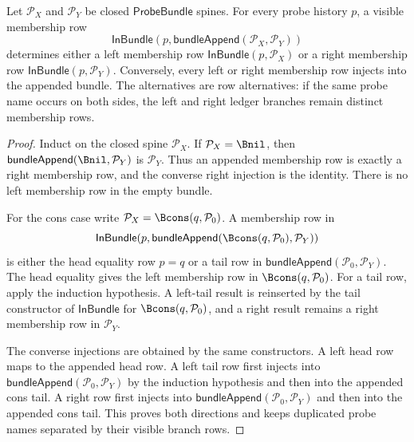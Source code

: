 \begin{lemma}
\label{lem:probebundle-append-membership-row-separation}
Let $\mathcal{P}_X$ and $\mathcal{P}_Y$ be closed $\mathsf{ProbeBundle}$ spines. For every probe history $p$, a visible membership row
$$
\mathsf{InBundle}(p,\mathsf{bundleAppend}(\mathcal{P}_X,\mathcal{P}_Y))
$$
determines either a left membership row $\mathsf{InBundle}(p,\mathcal{P}_X)$ or a right membership row $\mathsf{InBundle}(p,\mathcal{P}_Y)$. Conversely, every left or right membership row injects into the appended bundle. The alternatives are row alternatives: if the same probe name occurs on both sides, the left and right ledger branches remain distinct membership rows.
\end{lemma}
\begin{proof}
Induct on the closed spine $\mathcal{P}_X$. If $\mathcal{P}_X=\Bnil$, then $\mathsf{bundleAppend}(\Bnil,\mathcal{P}_Y)$ is $\mathcal{P}_Y$. Thus an appended membership row is exactly a right membership row, and the converse right injection is the identity. There is no left membership row in the empty bundle.

For the cons case write $\mathcal{P}_X=\Bcons(q,\mathcal{P}_0)$. A membership row in
$$
\mathsf{InBundle}(p,\mathsf{bundleAppend}(\Bcons(q,\mathcal{P}_0),\mathcal{P}_Y))
$$
is either the head equality row $p=q$ or a tail row in $\mathsf{bundleAppend}(\mathcal{P}_0,\mathcal{P}_Y)$. The head equality gives the left membership row in $\Bcons(q,\mathcal{P}_0)$. For a tail row, apply the induction hypothesis. A left-tail result is reinserted by the tail constructor of $\mathsf{InBundle}$ for $\Bcons(q,\mathcal{P}_0)$, and a right result remains a right membership row in $\mathcal{P}_Y$.

The converse injections are obtained by the same constructors. A left head row maps to the appended head row. A left tail row first injects into $\mathsf{bundleAppend}(\mathcal{P}_0,\mathcal{P}_Y)$ by the induction hypothesis and then into the appended cons tail. A right row first injects into $\mathsf{bundleAppend}(\mathcal{P}_0,\mathcal{P}_Y)$ and then into the appended cons tail. This proves both directions and keeps duplicated probe names separated by their visible branch rows.
\end{proof}

